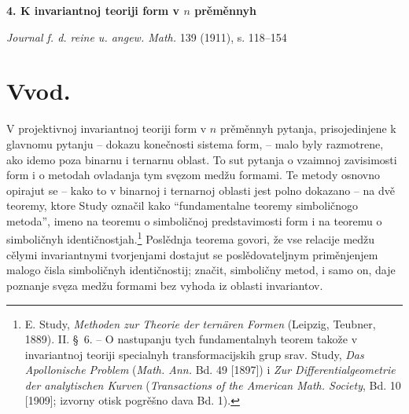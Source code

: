 \documentclass[11pt]{article}
\begin{document}
\begin{center}
{\Large\bfseries 4. K invariantnoj teoriji form v $n$ prěměnnyh}\par
\vspace{1.2em}
\emph{Journal f. d. reine u. angew. Math.} 139 (1911), s. 118--154
\end{center}

\section*{Vvod.}
V projektivnoj invariantnoj teoriji form v $n$ prěměnnyh pytanja, prisojedinjene k glavnomu pytanju -- dokazu konečnosti sistema form, -- malo byly razmotrene, ako idemo poza binarnu i ternarnu oblast. To sut pytanja o vzaimnoj zavisimosti form i o metodah ovladanja tym svęzom medžu formami. Te metody osnovno opirajut se -- kako to v binarnoj i ternarnoj oblasti jest polno dokazano -- na dvě teoremy, ktore Study označil kako ``fundamentalne teoremy simboličnogo metoda'', imeno na teoremu o simboličnoj predstavimosti form i na teoremu o simboličnyh identičnostjah.\footnote{E. Study, \emph{Methoden zur Theorie der ternären Formen} (Leipzig, Teubner, 1889). II. \S\ 6. -- O nastupanju tych fundamentalnyh teorem takože v invariantnoj teoriji specialnyh transformacijskih grup srav. Study, \emph{Das Apollonische Problem} (\emph{Math. Ann.} Bd. 49 [1897]) i \emph{Zur Differentialgeometrie der analytischen Kurven} (\emph{Transactions of the American Math. Society}, Bd. 10 [1909]; izvorny otisk pogrěšno dava Bd. 1).} Poslědnja teorema govori, že vse relacije medžu cělymi invariantnymi tvorjenjami dostajut se poslědovateljnym priměnjenjem malogo čisla simboličnyh identičnostij; značit, simboličny metod, i samo on, daje poznanje svęza medžu formami bez vyhoda iz oblasti invariantov.
\end{document}
